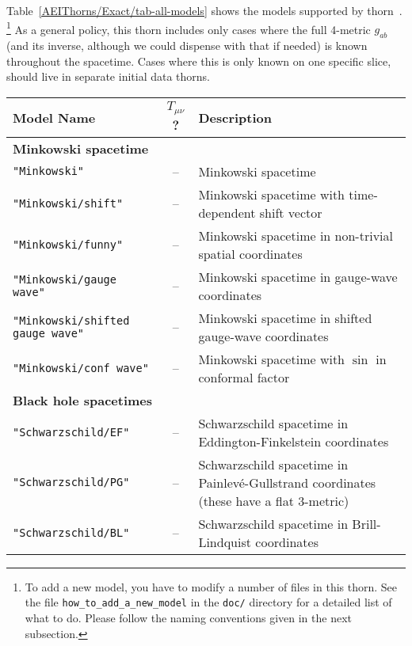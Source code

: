 Table~\ref{AEIThorns/Exact/tab-all-models} shows the models supported
by thorn~.%
\footnote{%
	 To add a new model, you have to modify a
	 number of files in this thorn.  See the file
	 {\tt how\_to\_add\_a\_new\_model} in the
	 {\tt doc/} directory for a detailed list of
	 what to do.  Please follow the naming conventions
	 given in the next subsection.
	 }%
{}  As a general policy, this thorn includes only cases where the full
4-metric $g_{ab}$ (and its inverse, although we could dispense with
that if needed) is known throughout the spacetime.  Cases where this
is only known on one specific slice, should live in separate initial
data thorns.

\begin{table}[htbp]
\begin{center}
\begin{tabular}{@{\qquad}lcp{80mm}}
Model Name
	& $T_{\mu\nu}$?
		& Description						\\
\hline %
%
\multicolumn{3}{l}{\bf Minkowski spacetime}				\\
{\tt "Minkowski"}
	& --	& Minkowski spacetime					\\
{\tt "Minkowski/shift"}
	& --	& Minkowski spacetime with time-dependent shift vector	\\
{\tt "Minkowski/funny"}
	& --	& Minkowski spacetime in non-trivial spatial coordinates\\
{\tt "Minkowski/gauge wave"}
	& --	& Minkowski spacetime in gauge-wave coordinates		\\
{\tt "Minkowski/shifted gauge wave"}
	& --	& Minkowski spacetime in shifted gauge-wave coordinates	\\
{\tt "Minkowski/conf wave"}
	& --	& Minkowski spacetime with $\sin$ in conformal factor	\\[1ex]
%
\multicolumn{3}{l}{\bf Black hole spacetimes}				\\
{\tt "Schwarzschild/EF"}
	& --	& Schwarzschild spacetime
		  in Eddington-Finkelstein coordinates			\\
{\tt "Schwarzschild/PG"}
	& --	& Schwarzschild spacetime in Painlev\'{e}-Gullstrand
		  coordinates (these have a flat 3-metric)		\\
{\tt "Schwarzschild/BL"}
	& --	& Schwarzschild spacetime in Brill-Lindquist coordinates\\

\end{tabular}
\end{center}
\end{table}
